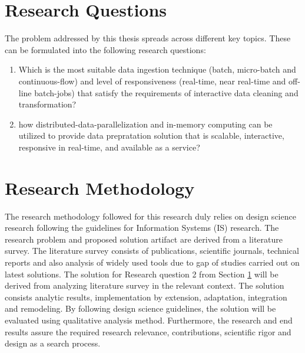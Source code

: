 \section{Research Questions}
\label{sec:reseach-ques}
\noindent The problem addressed by this thesis spreads across different key topics. These can be formulated into the following research questions:
\begin{enumerate}
\item Which is the most suitable data ingestion technique (batch, micro-batch and continuous-flow) and level of responsiveness  (real-time, near real-time and off-line batch-jobs) that satisfy the requirements of interactive data cleaning and transformation?
\item how distributed-data-parallelization and in-memory computing can be utilized to provide data prepratation solution that is scalable, interactive, responsive in real-time, and available as a service?
\end{enumerate}

\section{Research Methodology}
The research methodology followed for this research duly relies on design science \cite{von2004design} research following the guidelines for Information Systems (IS) research. The research problem and proposed solution artifact are derived from a literature survey. The literature survey consists of publications, scientific journals, technical reports and also analysis of widely used tools due to gap of studies carried out on latest solutions. The solution for Research question 2 from Section \ref{sec:reseach-ques} will be derived from analyzing literature survey in the relevant context. The solution consists analytic results, implementation by extension, adaptation, integration and remodeling.  By following design science guidelines, the solution will be evaluated using qualitative analysis method. Furthermore, the research and end results assure the  required research relevance, contributions, scientific rigor and design as a search process. 
